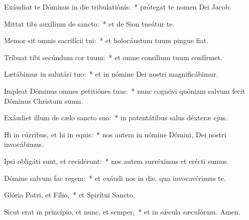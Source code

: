 \item Exáudiat te Dóminus in die tribulatiónis:~* prótegat te nomen Dei Jacob.

\item Mittat tibi auxílium de sancto:~* et de Sion tueátur te.

\item Memor sit omnis sacrifícii tui:~* et holocáustum tuum pingue fiat.

\item Tríbuat tibi secúndum cor tuum:~* et omne consílium tuum confírmet.

\item Lætábimur in salutári tuo:~* et in nómine Dei nostri magnificábimur.

\item Impleat Dóminus omnes petitiónes tuas:~* nunc cognóvi quóniam salvum fecit Dóminus Christum suum.

\item Exáudiet illum de cælo sancto suo:~* in potentátibus salus déxteræ ejus.

\item Hi in cúrribus, et hi in equis:~* nos autem in nómine Dómini, Dei nostri invocábimus.

\item Ipsi obligáti sunt, et cecidérunt:~* nos autem surréximus et erécti sumus.

\item Dómine salvum fac regem:~* et exáudi nos in die, qua invocavérimus te.

\item Glória Patri, et Fílio,~* et Spirítui Sancto.

\item Sicut erat in princípio, et nunc, et semper,~* et in sǽcula sæculórum. Amen.

